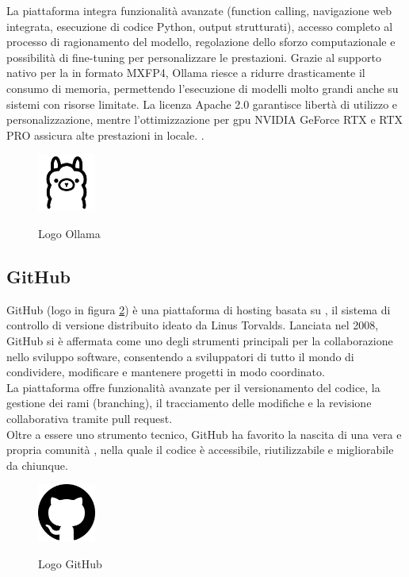 \noindent La piattaforma integra funzionalità avanzate (function calling, navigazione web integrata, esecuzione di codice Python, output strutturati), accesso completo al processo di ragionamento del modello, regolazione dello sforzo computazionale e possibilità di fine-tuning per personalizzare le prestazioni. 
Grazie al supporto nativo per la  in formato MXFP4, Ollama riesce a ridurre drasticamente il consumo di memoria, permettendo l’esecuzione di modelli molto grandi anche su sistemi con risorse limitate. 
La licenza Apache 2.0 garantisce libertà di utilizzo e personalizzazione, mentre l’ottimizzazione per \acrshort{gpu} NVIDIA GeForce RTX e RTX PRO assicura alte prestazioni in locale.
.
\begin{figure}[H]
    \centering
    \includegraphics[width=0.17\textwidth, alt={Logo Ollama}]{img/ollama.png}
    \caption[Logo Ollama]{Logo Ollama}\label{fig:logo_ollama}
\end{figure}


\subsection{GitHub}
\label{subsec:github}
\noindent GitHub (logo in figura \ref{fig:logo_github}) è una piattaforma di hosting basata su , il sistema di controllo di versione distribuito ideato da Linus Torvalds. Lanciata nel 2008, GitHub si è affermata come uno degli strumenti principali per la collaborazione nello sviluppo software, consentendo a sviluppatori di tutto il mondo di condividere, modificare e mantenere progetti in modo coordinato. \\La piattaforma offre funzionalità avanzate per il versionamento del codice, la gestione dei rami (branching), il tracciamento delle modifiche e la revisione collaborativa tramite pull request. \\Oltre a essere uno strumento tecnico, GitHub ha favorito la nascita di una vera e propria comunità , nella quale il codice è accessibile, riutilizzabile e migliorabile da chiunque.
\begin{figure}[H]
    \centering
    \includegraphics[width=0.17\textwidth, alt={Logo GitHub}]{img/github.png}
    \caption[Logo GitHub]{Logo GitHub}\label{fig:logo_github}
\end{figure}

